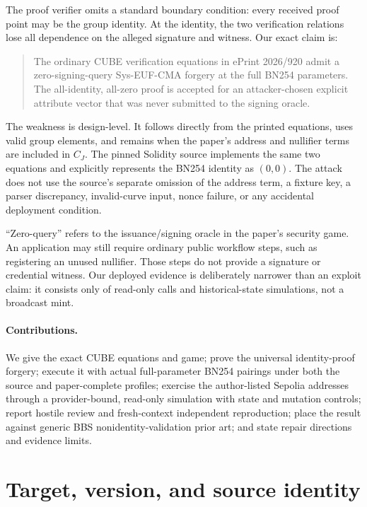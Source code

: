 \documentclass[10pt,a4paper]{article}
\begin{document}
The proof verifier omits a standard boundary condition: every received proof
point may be the group identity. At the identity, the two verification
relations lose all dependence on the alleged signature and witness. Our exact
claim is:

\begin{quote}
The ordinary CUBE verification equations in ePrint 2026/920 admit a
zero-signing-query Sys-EUF-CMA forgery at the full BN254 parameters. The
all-identity, all-zero proof is accepted for an attacker-chosen explicit
attribute vector that was never submitted to the signing oracle.
\end{quote}

The weakness is design-level. It follows directly from the printed equations,
uses valid group elements, and remains when the paper's address and nullifier
terms are included in $C_J$. The pinned Solidity source implements the same
two equations and explicitly represents the BN254 identity as $(0,0)$. The
attack does not use the source's separate omission of the address term, a
fixture key, a parser discrepancy, invalid-curve input, nonce failure, or any
accidental deployment condition.

``Zero-query'' refers to the issuance/signing oracle in the paper's security
game. An application may still require ordinary public workflow steps, such
as registering an unused nullifier. Those steps do not provide a signature or
credential witness. Our deployed evidence is deliberately narrower than an
exploit claim: it consists only of read-only calls and historical-state
simulations, not a broadcast mint.

\paragraph{Contributions.}
We give the exact CUBE equations and game; prove the universal identity-proof
forgery; execute it with actual full-parameter BN254 pairings under both the
source and paper-complete profiles; exercise the author-listed Sepolia
addresses through a provider-bound, read-only simulation with state and
mutation controls; report hostile review and fresh-context independent
reproduction; place the result against generic BBS nonidentity-validation
prior art; and state repair directions and evidence limits.

\section{Target, version, and source identity}
\end{document}
